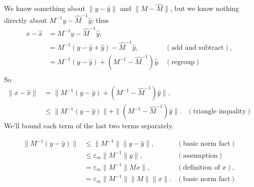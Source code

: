 \documentclass[usenames,dvipsnames,fleqn]{beamer}
\theoremstyle{definition}
\begin{document}
\begin{frame}

We know something about \(\| y - \widehat y\| \) and  \( \| M  - \widehat M \| \), but we know nothing directly about
\(M^{-1} y - \widehat M^{-1} \widehat y\); thus
\begin{align*}
   x - \widehat x &= M^{-1} y - \widehat M^{-1} \widehat y, \\
       &=M^{-1} \left(y - \widehat y + \widehat y \right)  - \widehat M^{-1} \widehat y, &(\mbox{add and subtract}), \\
       &= M^{-1} \left(y - \widehat y \right) + \left(M^{-1} - \widehat M^{-1} \right) \widehat y.  &(\mbox{regroup})\\
\end{align*}
So
\begin{align*}
  \|  x - \widehat x \| &= \|M^{-1} \left(y - \widehat y \right) + \left(M^{-1} - \widehat M^{-1} \right) \widehat y \|,\\
       &\leq  \|M^{-1} \left(y - \widehat y \right) \| + \| \left(M^{-1} - \widehat M^{-1} \right) \widehat y \|. &(\mbox{triangle inquality})
\end{align*}
We'll bound each term of the last two terms separately.

\end{frame}
\begin{frame}

\begin{align*}
   \|M^{-1} \left(y - \widehat y \right) \| &\leq \| M^{-1} \| \| y - \widehat y  \|,  &(\mbox{basic norm fact}) \\
               &\leq  \varepsilon_m \| M^{-1} \| y  \|, &(\mbox{assumption}) \\
               &= \varepsilon_m \| M^{-1} \| M x  \|,  &(\mbox{definition of } x ), \\
               &=  \varepsilon_m \| M^{-1} \|  \| M  \| \|x  \|.  &(\mbox{basic norm fact}) 
\end{align*}
\end{frame}
\end{document}
